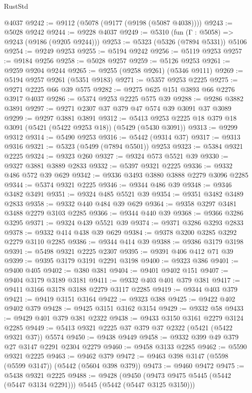 \begin{lexlean}{RustStd}
\begin{coremodule}
    @4037
@9242 := @9112 (@5078 (@9177 (@9198 (@5087 @4038))))
@9243 := @5028 @9242
@9244 := @9228 @4037
@9249 := @5310 (fun (Γ : @5058) => @9243 (@9186 (@9205 @9244)))
@9253 := @5323 (@5326 (@7894 @5331)) @5106
@9254 := @9249 @9253
@9255 := @5194 @9242
@9256 := @5119 @9253
@9257 := @9184 @9256
@9258 := @5028 @9257
@9259 := @5126 @9253
@9261 := @9259 @9204 @9244
@9265 := @9255 (@9258 @9261) (@5346 @9111)
@9269 := @5194 @9257 @9261 (@5351 @9183)
@9271 := @5357 @9253 @2225
@9275 := @9271 @2225 @66 @39 @575
@9282 := @9275 @625 @151 @3893 @66 @2276 @3917 @4037
@9286 := @5374 @9253 @2225 @575 @39
@9288 := @9286 @3882 @3891
@9297 := @9271 @2307 @37 @379 @47 @574 @39 @3091 @37 @3089
@9299 := @9297 @3881 @3891
@9312 := @5413 @9253 @2225 @18 @379 @18 @3091 (@5421 (@5422 @9253 @18)) (@5429 (@5430 @3091))
@9313 := @9299 @9312
@9314 := @5490 @9253
@9316 := @5442 (@9314 @37)
@9317 := @9313 @9316
@9321 := @5323 (@5499 (@7894 @5501)) @9253
@9323 := @5384 @9321 @2225
@9324 := @9323 @260
@9327 := @9324 @573 @5521 @39
@9330 := @9327 @3881 @3889 @2833
@9332 := @5397 @9321 @2225
@9336 := @9332 @486 @572 @39 @629
@9342 := @9336 @3493 @3880 @3888 @2279 @3096 @2285
@9344 := @5374 @9321 @2225
@9346 := @9344 @486 @39
@9348 := @9346 @3482 @3491
@9351 := @9324 @485 @5521 @39
@9354 := @9351 @3482 @3489 @2833
@9358 := @9332 @440 @484 @39 @629
@9364 := @9358 @3297 @3481 @3488 @2279 @3103 @2285
@9366 := @9344 @440 @39
@9368 := @9366 @3286 @3295
@9371 := @9324 @439 @5521 @39
@9374 := @9371 @3286 @3293 @2833
@9378 := @9332 @414 @438 @39 @629
@9384 := @9378 @3200 @3285 @3292 @2279 @3110 @2285
@9386 := @9344 @414 @39
@9388 := @9386 @3179 @3198
@9391 := @5498 @9321 @2225 @2307
@9395 := @9391 @406 @412 @71 @39
@9399 := @9395 @3179 @3191 @2291 @3198
@9400 := @9323 @386
@9401 := @9400 @405
@9402 := @380 @381
@9404 := @9401 @9402 @151
@9407 := @9404 @3179 @3189 @3181
@9411 := @9332 @403 @401 @379 @381
@9417 := @9411 @3166 @3178 @3188 @2279 @3117 @2285
@9419 := @9344 @403 @379
@9421 := @9419 @3151 @3164
@9422 := @9323 @388
@9425 := @9422 @402 @9402 @379
@9428 := @9425 @3151 @3162 @3154
@9429 := @9332 @58
@9433 := @9429 @401 @379 @381 @2322
@9438 := @9433 @3150 @3161 @2279 @3124 @2285
@9449 := @5413 @9321 @2225 @37 @379 @37 @2322 (@5421 (@5422 @9321 @37)) @5574
@9450 := @9438 @9449
@9458 := @9332 @399 @49 @379 @27 @3147 @2291 @2304 @2279
@9460 := @9458 @3133 @2285
@9462 := @5590 @9321 @2225
@9463 := @9462 @379
@9472 := @9463 @398 @3147 (@5598 (@5599 @3147)) (@5442 (@5604 @398 @379))
@9473 := @9460 @9472
@9475 := @5438 @9321 @2225
@9488 := @9428
    (@9450 (@9473 @9475 @5445 (@5442 (@5447 @3134 @2291))) @5445 (@5442 (@5447 @3125 @3150)))

\end{coremodule}
\end{lexlean}
